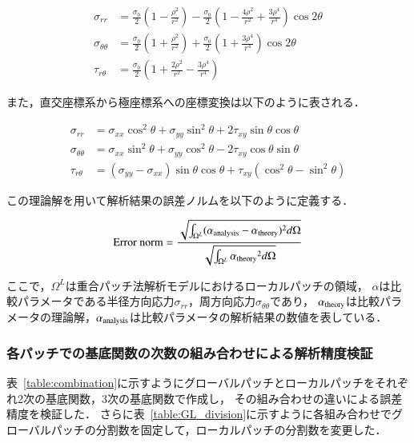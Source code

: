 \begin{align}
  \sigma_{rr} &= \frac{\sigma_0}{2}\left(1 - \frac{\rho^2}{r^2}\right) - \frac{\sigma_0}{2}\left(1 - \frac{4\rho^2}{r^2} + \frac{3\rho^4}{r^4}\right)\cos{2\theta}\\
  \sigma_{\theta\theta} &= \frac{\sigma_0}{2}\left(1 + \frac{\rho^2}{r^2}\right) + \frac{\sigma_0}{2} \left( 1 + \frac{3\rho^4}{r^4} \right) \cos{2\theta}\\
  \tau_{r\theta} &= \frac{\sigma_0}{2} \left( 1 + \frac{2\rho^2}{r^2} - \frac{3\rho^4}{r^4} \right)
\end{align}

\noindent
また，直交座標系から極座標系への座標変換は以下のように表される．

\begin{align}
  \sigma_{rr} &= \sigma_{xx} \cos^2\theta + \sigma_{yy} \sin^2\theta + 2\tau_{xy} \sin\theta \cos\theta \\
  \sigma_{\theta\theta} &= \sigma_{xx} \sin^2\theta + \sigma_{yy} \cos^2\theta - 2\tau_{xy} \cos\theta \sin\theta \\
  \tau_{r\theta} &= (\sigma_{yy} - \sigma_{xx}) \sin\theta \cos\theta + \tau_{xy}(\cos^2\theta - \sin^2\theta)
\end{align}

\noindent
この理論解を用いて解析結果の誤差ノルムを以下のように定義する．

\begin{equation}
  {\rm{Error\ norm}} = \frac{\sqrt{\int_{\Omega^L}(\alpha_{\rm{analysis}}-\alpha_{\rm{theory}})^2 d\Omega}}{\sqrt{\int_{\Omega^L}{\alpha_{\rm{theory}}}^2 d\Omega}}
\end{equation}

\noindent
ここで，$\Omega^L$は重合パッチ法解析モデルにおけるローカルパッチの領域，
$\alpha$は比較パラメータである半径方向応力$\sigma_{rr}$，周方向応力$\sigma_{\theta\theta}$であり，
$\alpha_{\rm{theory}}$は比較パラメータの理論解，$\alpha_{\rm{analysis}}$は比較パラメータの解析結果の数値を表している．

\subsubsection{各パッチでの基底関数の次数の組み合わせによる解析精度検証}
表~\ref{table:combination}に示すようにグローバルパッチとローカルパッチをそれぞれ2次の基底関数，3次の基底関数で作成し，
その組み合わせの違いによる誤差精度を検証した．
さらに表~\ref{table:GL_division}に示すように各組み合わせでグローバルパッチの分割数を固定して，ローカルパッチの分割数を変更した．


